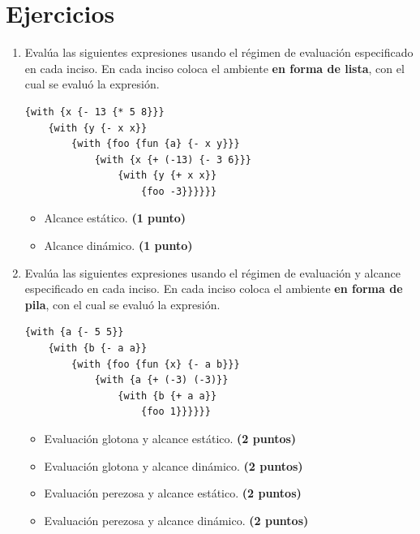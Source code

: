\documentclass[11pt]{article}
\begin{document}
\section*{Ejercicios}

\begin{enumerate}[leftmargin=0.8cm]

    \item Evalúa las siguientes expresiones usando el régimen de evaluación especificado en cada inciso. En cada inciso coloca el ambiente \textbf{en forma de lista}, con el cual se evaluó la expresión.
    \begin{lstlisting}
{with {x {- 13 {* 5 8}}}
    {with {y {- x x}}
        {with {foo {fun {a} {- x y}}}
            {with {x {+ (-13) {- 3 6}}}
                {with {y {+ x x}}
                    {foo -3}}}}}}
    \end{lstlisting}
    \begin{itemize}
        \item Alcance estático. \textbf{(1 punto)}
        \item Alcance dinámico. \textbf{(1 punto)}
    \end{itemize}
    \item Evalúa las siguientes expresiones usando el régimen de evaluación y alcance especificado en cada inciso. En cada inciso coloca el ambiente \textbf{en forma de pila}, con el cual se evaluó la expresión.
    \begin{lstlisting}
{with {a {- 5 5}}
    {with {b {- a a}}
        {with {foo {fun {x} {- a b}}}
            {with {a {+ (-3) (-3)}}
                {with {b {+ a a}}
                    {foo 1}}}}}}
    \end{lstlisting}
    \begin{itemize}
        \item Evaluación glotona y alcance estático. \textbf{(2 puntos)}
        \item Evaluación glotona y alcance dinámico. \textbf{(2 puntos)}
        \item Evaluación perezosa y alcance estático. \textbf{(2 puntos)}
        \item Evaluación perezosa y alcance dinámico. \textbf{(2 puntos)}
    \end{itemize}
\end{enumerate}
\end{document}
